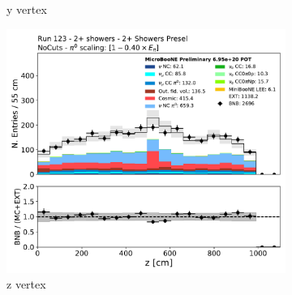 \begin{figure}[H]
\begin{subfigure}{0.3\textwidth}
    \caption{y vertex}
    \end{subfigure}
    \begin{subfigure}{0.3\textwidth}
    \includegraphics[width=1.0\textwidth]{Sidebands/Figures/TwoShr_1e0pSel/Presel/reco_nu_vtx_z.pdf}
    \caption{z vertex}
    \end{subfigure}
    \caption{} 
    \label{fig:HE_1eNp_1}
\end{figure}

